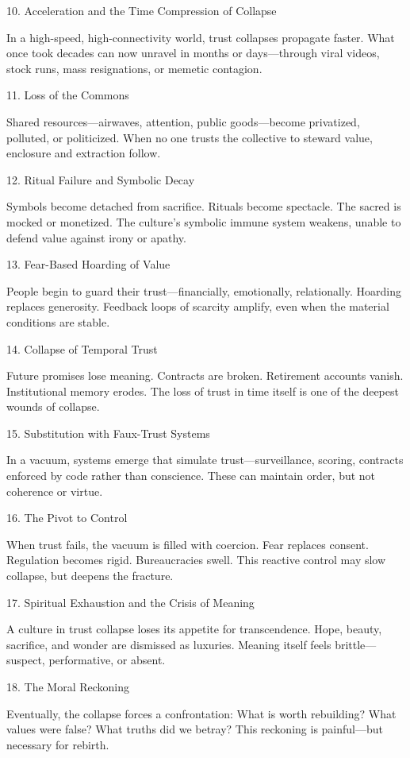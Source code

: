 \documentclass[11pt,oneside]{book}
\begin{document}
10. Acceleration and the Time Compression of Collapse


In a high-speed, high-connectivity world, trust collapses propagate faster. What once took decades can now unravel in months or days—through viral videos, stock runs, mass resignations, or memetic contagion.

11. Loss of the Commons


Shared resources—airwaves, attention, public goods—become privatized, polluted, or politicized. When no one trusts the collective to steward value, enclosure and extraction follow.

12. Ritual Failure and Symbolic Decay


Symbols become detached from sacrifice. Rituals become spectacle. The sacred is mocked or monetized. The culture’s symbolic immune system weakens, unable to defend value against irony or apathy.

13. Fear-Based Hoarding of Value


People begin to guard their trust—financially, emotionally, relationally. Hoarding replaces generosity. Feedback loops of scarcity amplify, even when the material conditions are stable.

14. Collapse of Temporal Trust


Future promises lose meaning. Contracts are broken. Retirement accounts vanish. Institutional memory erodes. The loss of trust in time itself is one of the deepest wounds of collapse.

15. Substitution with Faux-Trust Systems


In a vacuum, systems emerge that simulate trust—surveillance, scoring, contracts enforced by code rather than conscience. These can maintain order, but not coherence or virtue.

16. The Pivot to Control


When trust fails, the vacuum is filled with coercion. Fear replaces consent. Regulation becomes rigid. Bureaucracies swell. This reactive control may slow collapse, but deepens the fracture.

17. Spiritual Exhaustion and the Crisis of Meaning


A culture in trust collapse loses its appetite for transcendence. Hope, beauty, sacrifice, and wonder are dismissed as luxuries. Meaning itself feels brittle—suspect, performative, or absent.

18. The Moral Reckoning


Eventually, the collapse forces a confrontation: What is worth rebuilding? What values were false? What truths did we betray? This reckoning is painful—but necessary for rebirth.
\end{document}
